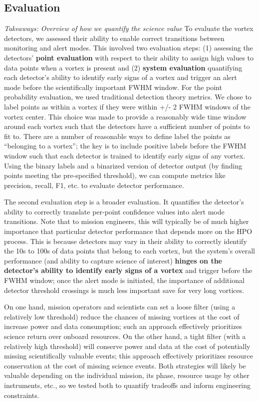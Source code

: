 \subsection{Evaluation}\label{subsec:methods:evaluation}
\textit{Takeaways: Overview of how we quantify the science value}
To evaluate the vortex detectors, we assessed their ability to enable correct transitions between monitoring and alert modes. 
This involved two evaluation steps: (1) assessing the detectors' \textbf{point evaluation} with respect to their ability to assign high values to data points when a vortex is present and (2) \textbf{system evaluation} quantifying each detector's ability to identify early signs of a vortex and trigger an alert mode before the scientifically important \acrshort{FWHM} window.
For the point probability evaluation, we used traditional detection theory metrics.
We chose to label points as within a vortex if they were within +/- 2 \acrshort{FWHM} windows of the vortex center.
This choice was made to provide a reasonably wide time window around each vortex such that the detectors have a sufficient number of points to fit to.
There are a number of reasonable ways to define label the points as ``belonging to a vortex''; the key is to include positive labels before the \acrshort{FWHM} window such that each detector is trained to identify early signs of any vortex. 
Using the binary labels and a binarized version of detector output (by finding points meeting the pre-specified threshold), we can compute metrics like precision, recall, F1, etc. to evaluate detector performance. 


The second evaluation step is a broader evaluation. 
It quantifies the detector's ability to correctly translate per-point confidence values into alert mode transitions.
Note that to mission engineers, this will typically be of much higher importance that particular detector performance that depends more on the \acrshort{HPO} process.
This is because detectors may vary in their ability to correctly identify the 10s to 100s of data points that belong to each vortex, but the system's overall performance (and ability to capture science of interest) \textbf{hinges on the detector's ability to identify early signs of a vortex} and trigger before the \acrshort{FWHM} window; once the alert mode is initiated, the importance of additional detector threshold crossings is much less important save for very long vortices.

On one hand, mission operators and scientists can set a loose filter (using a relatively low threshold) reduce the chances of missing vortices at the cost of increase power and data consumption; such an approach effectively prioritizes science return over onboard resources.
On the other hand, a tight filter (with a relatively high threshold) will conserve power and data at the cost of potentially missing scientifically valuable events; this approach effectively prioritizes resource conservation at the cost of missing science events.
Both strategies will likely be valuable depending on the individual mission, its phase, resource usage by other instruments, etc., so we tested both to quantify tradeoffs and inform engineering constraints.

